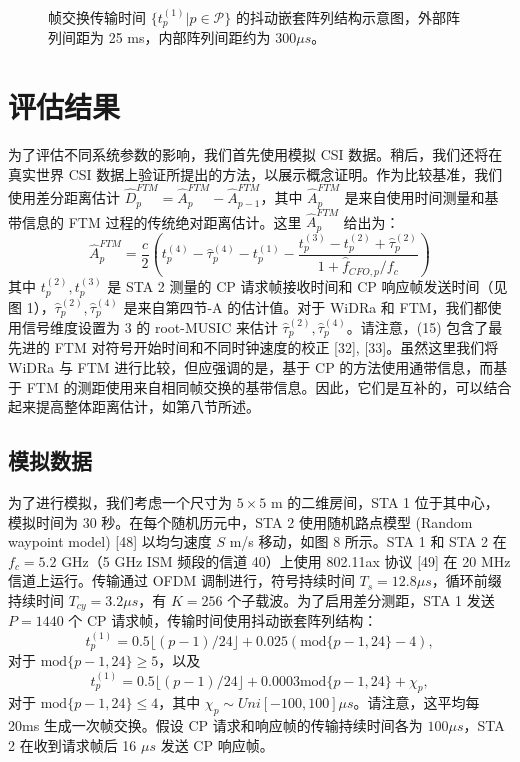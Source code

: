 \documentclass[journal]{IEEEtran}
\begin{document}
\begin{figure}[htbp]
\centering
{}
\caption{帧交换传输时间 $\{t_p^{(1)} | p \in \mathcal{P}\}$ 的抖动嵌套阵列结构示意图，外部阵列间距为 25 ms，内部阵列间距约为 $300 \mu s$。}
\label{fig:fig7}
\end{figure}

\section{评估结果}
为了评估不同系统参数的影响，我们首先使用模拟 CSI 数据。稍后，我们还将在真实世界 CSI 数据上验证所提出的方法，以展示概念证明。作为比较基准，我们使用差分距离估计 $\hat{D}_p^{FTM} = \hat{A}_p^{FTM} - \hat{A}_{p-1}^{FTM}$，其中 $\hat{A}_p^{FTM}$ 是来自使用时间测量和基带信息的 FTM 过程的传统绝对距离估计。这里 $\hat{A}_p^{FTM}$ 给出为：
\begin{equation}
\hat{A}_p^{FTM} = \frac{c}{2} \left( t_p^{(4)} - \hat{\tau}_p^{(4)} - t_p^{(1)} - \frac{t_p^{(3)} - t_p^{(2)} + \hat{\tau}_p^{(2)}}{1 + \hat{f}_{CFO,p}/f_c} \right) \label{eq:15}
\end{equation}
其中 $t_p^{(2)}, t_p^{(3)}$ 是 STA 2 测量的 CP 请求帧接收时间和 CP 响应帧发送时间（见图 1），$\hat{\tau}_p^{(2)}, \hat{\tau}_p^{(4)}$ 是来自第四节-A 的估计值。对于 WiDRa 和 FTM，我们都使用信号维度设置为 3 的 root-MUSIC 来估计 $\hat{\tau}_p^{(2)}, \hat{\tau}_p^{(4)}$。请注意，(15) 包含了最先进的 FTM 对符号开始时间和不同时钟速度的校正 [32], [33]。虽然这里我们将 WiDRa 与 FTM 进行比较，但应强调的是，基于 CP 的方法使用通带信息，而基于 FTM 的测距使用来自相同帧交换的基带信息。因此，它们是互补的，可以结合起来提高整体距离估计，如第八节所述。

\subsection{模拟数据}
为了进行模拟，我们考虑一个尺寸为 $5 \times 5$ m 的二维房间，STA 1 位于其中心，模拟时间为 30 秒。在每个随机历元中，STA 2 使用随机路点模型 (Random waypoint model) [48] 以均匀速度 $S$ m/s 移动，如图 8 所示。STA 1 和 STA 2 在 $f_c = 5.2$ GHz（5 GHz ISM 频段的信道 40）上使用 802.11ax 协议 [49] 在 20 MHz 信道上运行。传输通过 OFDM 调制进行，符号持续时间 $T_s = 12.8 \mu s$，循环前缀持续时间 $T_{cy} = 3.2 \mu s$，有 $K=256$ 个子载波。为了启用差分测距，STA 1 发送 $P=1440$ 个 CP 请求帧，传输时间使用抖动嵌套阵列结构：
\begin{equation*}
t_p^{(1)} = 0.5 \lfloor (p-1)/24 \rfloor + 0.025 (\text{mod}\{p-1, 24\} - 4),
\end{equation*}
对于 $\text{mod}\{p-1, 24\} \ge 5$，以及
\begin{equation*}
t_p^{(1)} = 0.5 \lfloor (p-1)/24 \rfloor + 0.0003 \text{mod}\{p-1, 24\} + \chi_p,
\end{equation*}
对于 $\text{mod}\{p-1, 24\} \le 4$，其中 $\chi_p \sim Uni[-100, 100] \mu s$。请注意，这平均每 20ms 生成一次帧交换。假设 CP 请求和响应帧的传输持续时间各为 $100 \mu s$，STA 2 在收到请求帧后 16 $\mu s$ 发送 CP 响应帧。
\end{document}
